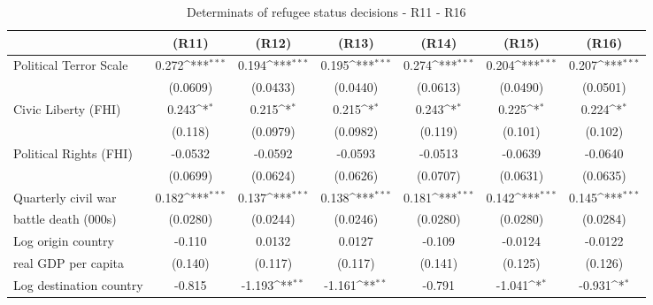 \begin{table}[!ht]\centering \scriptsize
\def\sym#1{\ifmmode^{#1}\else\(^{#1}\)\fi}
\caption{Determinats of refugee status decisions - R11 - R16}
\begin{tabular}{l*{6}{c}}
\hline\hline
                    &\multicolumn{1}{c}{(R11)}&\multicolumn{1}{c}{(R12)}&\multicolumn{1}{c}{(R13)}&\multicolumn{1}{c}{(R14)}&\multicolumn{1}{c}{(R15)}&\multicolumn{1}{c}{(R16)}\\
\hline
Political Terror Scale&       0.272\sym{***}&       0.194\sym{***}&       0.195\sym{***}&       0.274\sym{***}&       0.204\sym{***}&       0.207\sym{***}\\
                    &    (0.0609)         &    (0.0433)         &    (0.0440)         &    (0.0613)         &    (0.0490)         &    (0.0501)         \\
[0,5em]
Civic Liberty (FHI) &       0.243\sym{*}  &       0.215\sym{*}  &       0.215\sym{*}  &       0.243\sym{*}  &       0.225\sym{*}  &       0.224\sym{*}  \\
                    &     (0.118)         &    (0.0979)         &    (0.0982)         &     (0.119)         &     (0.101)         &     (0.102)         \\
[0,5em]
Political Rights (FHI)&     -0.0532         &     -0.0592         &     -0.0593         &     -0.0513         &     -0.0639         &     -0.0640         \\
                    &    (0.0699)         &    (0.0624)         &    (0.0626)         &    (0.0707)         &    (0.0631)         &    (0.0635)         \\
[0,5em]
Quarterly civil war &       0.182\sym{***}&       0.137\sym{***}&       0.138\sym{***}&       0.181\sym{***}&       0.142\sym{***}&       0.145\sym{***}\\
 battle death (000s)                   &    (0.0280)         &    (0.0244)         &    (0.0246)         &    (0.0280)         &    (0.0280)         &    (0.0284)         \\
[0,5em]
Log origin country&      -0.110         &      0.0132         &      0.0127         &      -0.109         &     -0.0124         &     -0.0122         \\
 real GDP per capita                    &     (0.140)         &     (0.117)         &     (0.117)         &     (0.141)         &     (0.125)         &     (0.126)         \\
[0,5em]
Log destination country&      -0.815         &      -1.193\sym{**} &      -1.161\sym{**} &      -0.791         &      -1.041\sym{*}  &      -0.931\sym{*}  \\

\end{tabular}
\end{table}
